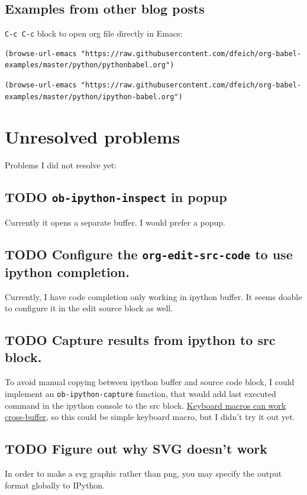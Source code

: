 \documentclass[11pt]{article}
\begin{document}
\subsection{Examples from other blog posts}
\label{sec:orgheadline49}
\texttt{C-c C-c} block to open org file directly in Emacs:
\begin{verbatim}
(browse-url-emacs "https://raw.githubusercontent.com/dfeich/org-babel-examples/master/python/pythonbabel.org")
\end{verbatim}


\begin{verbatim}
(browse-url-emacs "https://raw.githubusercontent.com/dfeich/org-babel-examples/master/python/ipython-babel.org")
\end{verbatim}

\section{Unresolved problems}
\label{sec:orgheadline54}
Problems I did not resolve yet:
\subsection{{\bfseries\sffamily TODO} \texttt{ob-ipython-inspect} in popup}
\label{sec:orgheadline50}
Currently it opens a separate buffer. I would prefer a popup.
\subsection{{\bfseries\sffamily TODO} Configure the \texttt{org-edit-src-code} to use ipython completion.}
\label{sec:orgheadline51}
Currently, I have code completion only working in ipython buffer.
It seems doable to configure it in the edit source block as well.
\subsection{{\bfseries\sffamily TODO} Capture results from ipython to src block.}
\label{sec:orgheadline52}
To avoid manual copying between ipython buffer and source code block, I could implement an \texttt{ob-ipython-capture} function, that would add last executed
command in the ipython console to the src block.
\href{http://stackoverflow.com/questions/27260049/emacs-cross-file-keyboard-macro}{Keyboard macros can work cross-buffer}, so this could be simple keyboard macro, but I didn't try it out yet.
\subsection{{\bfseries\sffamily TODO} Figure out why SVG doesn't work}
\label{sec:orgheadline53}
In order to make a svg graphic rather than png, you may specify the
output format globally to IPython.
\end{document}
